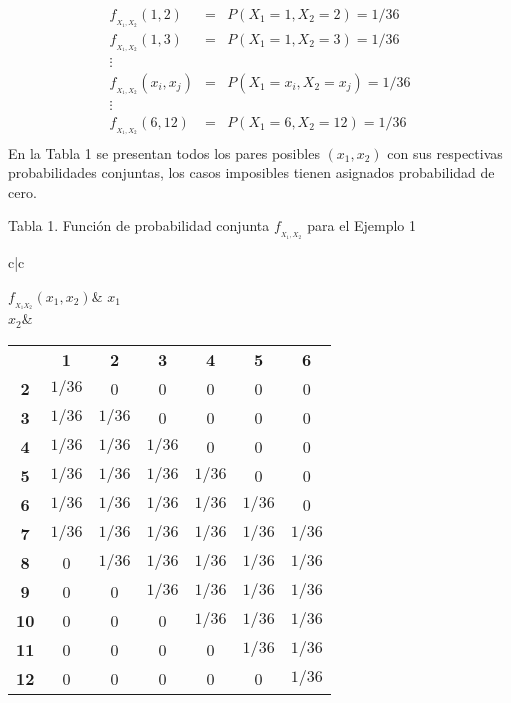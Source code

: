 \documentclass[base=hide,12pt]{elegantbook}
\begin{document}
\begin{eqnarray*}
	f_{_{X_1,X_2}}(1,2)&=&P(X_1=1,X_2=2)=1/36\\
	f_{_{X_1,X_2}}(1,3)&=&P(X_1=1,X_2=3)=1/36\\
	\vdots\\
	f_{_{X_1,X_2}}(x_i,x_j)&=&P(X_1=x_i,X_2=x_j)=1/36\\
	\vdots\\
	f_{_{X_1,X_2}}(6,12)&=&P(X_1=6,X_2=12)=1/36\\
\end{eqnarray*}
En la Tabla 1 se presentan todos los pares posibles $(x_1,x_2)$ con sus respectivas probabilidades conjuntas, los casos imposibles tienen asignados probabilidad de cero.
\vspace{.5cm}	
\begin{center}
Tabla 1. Función de probabilidad conjunta $f_{_{X_{1},X_{2}}}$ para el Ejemplo 1\\
	\begin{tabular}{c|c}
		
		$f_{_{X_1 X_2}}(x_{1},x_{2})$& \textcolor{col5}{\bf $x_{1}$} \\	
		\hline 
		\textcolor{col4}{\bf $x_{2}$}&	
		\begin{tabular}{ccccccc}
			& \textcolor{col5}{\bf 1} & \textcolor{col5}{\bf 2} & \textcolor{col5}{\bf 3} & \textcolor{col5}{\bf 4} & \textcolor{col5}{\bf 5} & \textcolor{col5}{\bf 6} \\	
			\textcolor{col4}{\bf 2} &    $1/36$&  0&  0&  0&  0& 0 \\
			\textcolor{col4}{\bf 3} &     $1/36$&  $1/36$&  0&  0&  0& 0 \\
			\textcolor{col4}{\bf 4} &     $1/36$&  $1/36$ &  $1/36$&  0&  0& 0 \\
			\textcolor{col4}{\bf 5} &     $1/36$&   $1/36$&   $1/36$&   $1/36$&  0& 0 \\
			\textcolor{col4}{\bf 6} &     $1/36$&   $1/36$&   $1/36$&   $1/36$&   $1/36$& 0 \\
			\textcolor{col4}{\bf 7} &     $1/36$&   $1/36$&   $1/36$&   $1/36$&  $1/36$& $1/36$ \\
			\textcolor{col4}{\bf 8} &    0&   $1/36$&   $1/36$&  $1/36$&   $1/36$&  $1/36$ \\
			\textcolor{col4}{\bf 9} &    0&  0&  $1/36$&  $1/36$&   $1/36$&  $1/36$ \\
			\textcolor{col4}{\bf 10}&    0&  0&  0& $1/36$&   $1/36$&  $1/36$ \\
			\textcolor{col4}{\bf 11}&    0&  0&  0&  0&  $1/36$&  $1/36$ \\
			\textcolor{col4}{\bf 12}&    0&  0&  0&  0&  0&  $1/36$ \\
		\end{tabular}	
		\\
	\end{tabular}	
\end{center}
\end{document}
